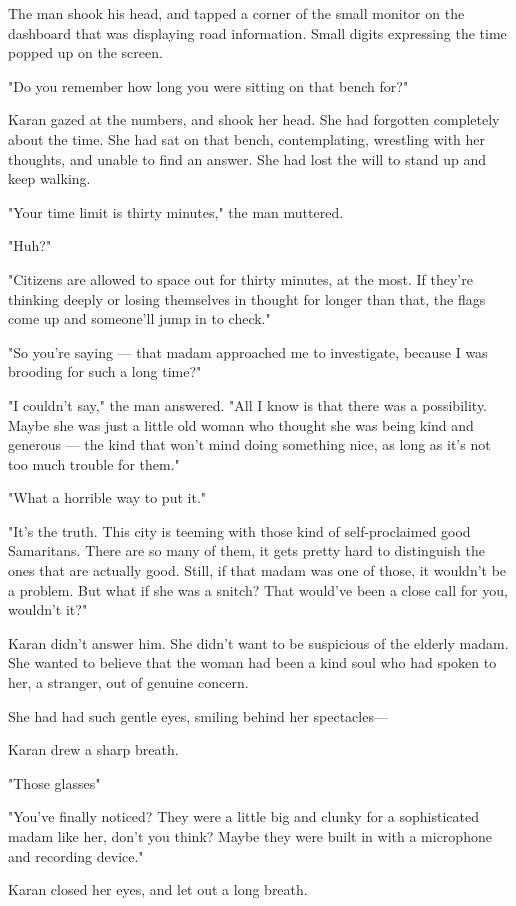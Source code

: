 The man shook his head, and tapped a corner of the small monitor on the
dashboard that was displaying road information. Small digits expressing
the time popped up on the screen.

"Do you remember how long you were sitting on that bench for?"

Karan gazed at the numbers, and shook her head. She had forgotten
completely about the time. She had sat on that bench, contemplating,
wrestling with her thoughts, and unable to find an answer. She had lost
the will to stand up and keep walking.

"Your time limit is thirty minutes," the man muttered.

"Huh?"

"Citizens are allowed to space out for thirty minutes, at the most. If
they're thinking deeply or losing themselves in thought for longer than
that, the flags come up and someone'll jump in to check."

"So you're saying --- that madam approached me to investigate, because I
was brooding for such a long time?"

"I couldn't say," the man answered. "All I know is that there was a
possibility. Maybe she was just a little old woman who thought she was
being kind and generous --- the kind that won't mind doing something nice,
as long as it's not too much trouble for them."

"What a horrible way to put it."

"It's the truth. This city is teeming with those kind of self-proclaimed
good Samaritans. There are so many of them, it gets pretty hard to
distinguish the ones that are actually good. Still, if that madam was
one of those, it wouldn't be a problem. But what if she was a snitch?
That would've been a close call for you, wouldn't it?"

Karan didn't answer him. She didn't want to be suspicious of the elderly
madam. She wanted to believe that the woman had been a kind soul who had
spoken to her, a stranger, out of genuine concern.

She had had such gentle eyes, smiling behind her spectacles---

Karan drew a sharp breath.

"Those glasses\el "

"You've finally noticed? They were a little big and clunky for a
sophisticated madam like her, don't you think? Maybe they were built in
with a microphone and recording device."

Karan closed her eyes, and let out a long breath.

